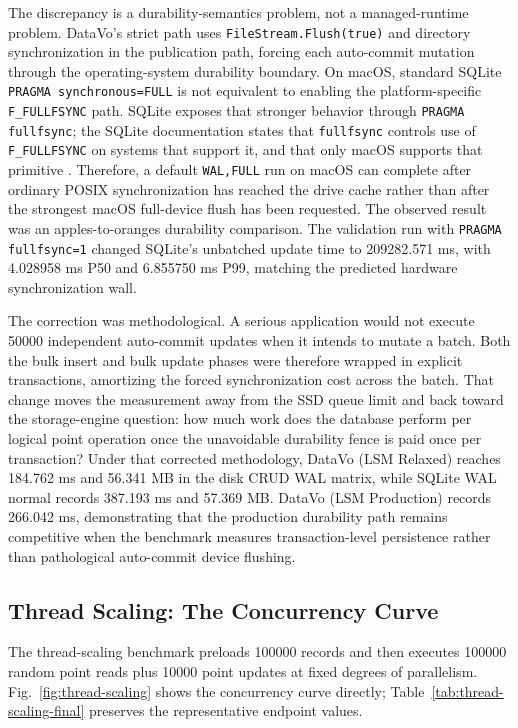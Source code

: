 \documentclass[11pt]{article}
\begin{document}
The discrepancy is a durability-semantics problem, not a managed-runtime problem. DataVo's strict path uses \texttt{FileStream.Flush(true)} and directory synchronization in the publication path, forcing each auto-commit mutation through the operating-system durability boundary. On macOS, standard SQLite \texttt{PRAGMA synchronous=FULL} is not equivalent to enabling the platform-specific \mbox{\texttt{F\_FULLFSYNC}} path. SQLite exposes that stronger behavior through \texttt{PRAGMA fullfsync}; the SQLite documentation states that \texttt{fullfsync} controls use of \mbox{\texttt{F\_FULLFSYNC}} on systems that support it, and that only macOS supports that primitive \cite{sqlite-pragma}. Therefore, a default \texttt{WAL,FULL} run on macOS can complete after ordinary POSIX synchronization has reached the drive cache rather than after the strongest macOS full-device flush has been requested. The observed result was an apples-to-oranges durability comparison. The validation run with \texttt{PRAGMA fullfsync=1} changed SQLite's unbatched update time to \num{209282.571} ms, with \num{4.028958} ms P50 and \num{6.855750} ms P99, matching the predicted hardware synchronization wall.

The correction was methodological. A serious application would not execute \num{50000} independent auto-commit updates when it intends to mutate a batch. Both the bulk insert and bulk update phases were therefore wrapped in explicit transactions, amortizing the forced synchronization cost across the batch. That change moves the measurement away from the SSD queue limit and back toward the storage-engine question: how much work does the database perform per logical point operation once the unavoidable durability fence is paid once per transaction? Under that corrected methodology, DataVo (LSM Relaxed) reaches \num{184.762} ms and \num{56.341} MB in the disk CRUD WAL matrix, while SQLite WAL normal records \num{387.193} ms and \num{57.369} MB. DataVo (LSM Production) records \num{266.042} ms, demonstrating that the production durability path remains competitive when the benchmark measures transaction-level persistence rather than pathological auto-commit device flushing.

\subsection{Thread Scaling: The Concurrency Curve}
The thread-scaling benchmark preloads \num{100000} records and then executes \num{100000} random point reads plus \num{10000} point updates at fixed degrees of parallelism. Fig.~\ref{fig:thread-scaling} shows the concurrency curve directly; Table~\ref{tab:thread-scaling-final} preserves the representative endpoint values.
\end{document}
